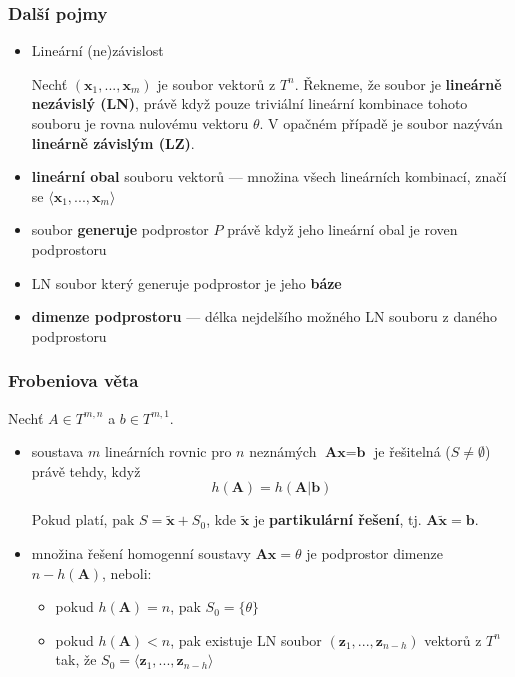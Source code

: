 \subsubsection*{Další pojmy}
\begin{itemize}
	\item Lineární (ne)závislost
	
	Nechť $(\textbf{x}_1,...,\textbf{x}_m)$ je soubor vektorů z $T^n$. Řekneme, že soubor je \textbf{lineárně nezávislý (LN)}, právě když pouze triviální lineární kombinace tohoto souboru je rovna nulovému vektoru $\theta$. V opačném případě je soubor nazýván \textbf{lineárně závislým (LZ)}.
	
	\item \textbf{lineární obal} souboru vektorů --- množina všech lineárních kombinací, značí se $\langle \textbf{x}_1,...,\textbf{x}_m \rangle$
	\item soubor \textbf{generuje} podprostor $P$ právě když jeho lineární obal je roven podprostoru
	\item LN soubor který generuje podprostor je jeho \textbf{báze}
	\item \textbf{dimenze podprostoru} --- délka nejdelšího možného LN souboru z daného podprostoru
\end{itemize}

\subsubsection*{Frobeniova věta}
Nechť $A \in T^{m, n}$ a $b \in T^{m,1}$.
\begin{itemize}
	\item soustava $m$ lineárních rovnic pro $n$ neznámých $\textbf{Ax} = \textbf{b}$ je řešitelná ($S \neq \emptyset$) právě tehdy, když \[h(\textbf{A}) = h(\textbf{A}|\textbf{b})\]
	
	Pokud platí, pak $ S = \tilde{\textbf{x}} + S_0$, kde $\tilde{\textbf{x}}$ je \textbf{partikulární řešení}, tj. $\textbf{A}\tilde{\textbf{x}} = \textbf{b}$.
	\item množina řešení homogenní soustavy $\textbf{Ax} = \theta$ je podprostor dimenze $n - h(\textbf{A})$, neboli:
	\begin{itemize}
		\item pokud $h(\textbf{A}) = n$, pak $S_0 = \{\theta\}$
		\item pokud $h(\textbf{A}) < n$, pak existuje LN soubor $(\textbf{z}_1,...,\textbf{z}_{n-h})$ vektorů z $T^n$ tak, že $S_0 = \langle \textbf{z}_1,...,\textbf{z}_{n-h} \rangle$
	\end{itemize}
\end{itemize}
